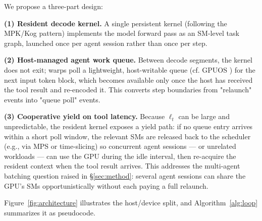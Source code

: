 \documentclass{article}
\begin{document}
We propose a three-part design:

\textbf{(1) Resident decode kernel.} A single persistent kernel
(following the MPK/Kog pattern) implements the model forward pass as
an SM-level task graph, launched once per agent session rather than
once per step.

\textbf{(2) Host-managed agent work queue.} Between decode segments,
the kernel does not exit; warps poll a lightweight, host-writable
queue (cf. GPUOS \citep{gpuos2026}) for the next input token block,
which becomes available only once the host has received the tool
result and re-encoded it. This converts step boundaries from
"relaunch" events into "queue poll" events.

\textbf{(3) Cooperative yield on tool latency.} Because $\ell_t$ can
be large and unpredictable, the resident kernel exposes a yield path:
if no queue entry arrives within a short poll window, the relevant
SMs are released back to the scheduler (e.g., via MPS or
time-slicing) so concurrent agent sessions --- or unrelated
workloads --- can use the GPU during the idle interval, then
re-acquire the resident context when the tool result arrives. This
addresses the multi-agent batching question raised in
\S\ref{sec:method}: several agent sessions can share the GPU's SMs
opportunistically without each paying a full relaunch.

Figure~\ref{fig:architecture} illustrates the host/device split, and
Algorithm~\ref{alg:loop} summarizes it as pseudocode.
\end{document}
